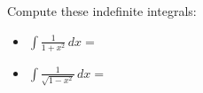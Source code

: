 Compute these indefinite integrals:
\medskip
\begin{itemize}
\item[] $\displaystyle \int \frac{1}{1+x^2} \,dx =$
\vspace{1.8in}

\item[] $\displaystyle \int \frac{1}{\sqrt{1-x^2}} \,dx =$
\end{itemize}